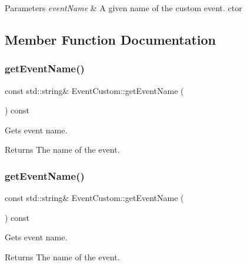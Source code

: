 \begin{DoxyParams}{Parameters}
{\em event\+Name} & A given name of the custom event.  ctor \\
\hline
\end{DoxyParams}


\subsection{Member Function Documentation}
\mbox{\label{classEventCustom_ad958403590c798a14c6cb37f33181729}} 
\subsubsection{\texorpdfstring{get\+Event\+Name()}{getEventName()}\hspace{0.1cm}{\footnotesize\ttfamily [1/2]}}
{\footnotesize\ttfamily const std\+::string\& Event\+Custom\+::get\+Event\+Name (\begin{DoxyParamCaption}{ }\end{DoxyParamCaption}) const\hspace{0.3cm}{\ttfamily [inline]}}

Gets event name.

\begin{DoxyReturn}{Returns}
The name of the event. 
\end{DoxyReturn}
\mbox{\label{classEventCustom_ad958403590c798a14c6cb37f33181729}} 
\subsubsection{\texorpdfstring{get\+Event\+Name()}{getEventName()}\hspace{0.1cm}{\footnotesize\ttfamily [2/2]}}
{\footnotesize\ttfamily const std\+::string\& Event\+Custom\+::get\+Event\+Name (\begin{DoxyParamCaption}{ }\end{DoxyParamCaption}) const\hspace{0.3cm}{\ttfamily [inline]}}

Gets event name.

\begin{DoxyReturn}{Returns}
The name of the event. 
\end{DoxyReturn}
\mbox{\label{classEventCustom_a529d67c97ccfc46cff7a18878fd396f9}} 
